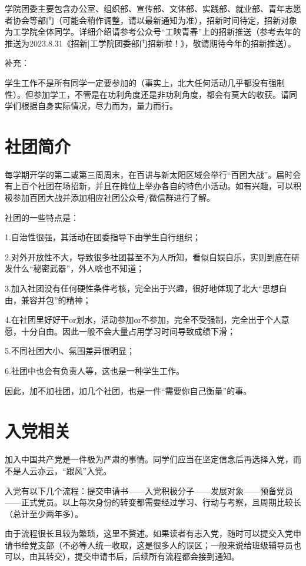 \documentclass[11pt,oneside]{book}
\begin{document}
学院团委主要包含办公室、组织部、宣传部、文体部、实践部、就业部、青年志愿者协会等部门（可能会稍作调整，请以最新通知为准），招新时间待定，招新对象为工学院全体同学。详细介绍请参考公众号“工映青春”上的招新推送（参考去年的推送为2023.8.31《招新|工学院团委部门招新啦！》，敬请期待今年的招新推送）。

补充：

学生工作不是所有同学一定要参加的（事实上，北大任何活动几乎都没有强制性）。但参加学工，不管是在功利角度还是非功利角度，都会有莫大的收获。请同学们根据自身实际情况，尽力而为，量力而行。

\newpage

    \section{社团简介}
    每学期开学的第二或第三周周末，在百讲与新太阳区域会举行“百团大战”。届时会有上百个社团在场招新，并且在摊位上举办各自的特色小活动。如有兴趣，可以积极参加百团大战并添加相应社团公众号/微信群进行了解。

社团的一些特点是：

1.自治性很强，其活动在团委指导下由学生自行组织；

2.对外开放性不大，导致很多社团甚至不为人所知，看似自娱自乐，实则到底在研发什么“秘密武器”，外人啥也不知道；

3.加入社团没有任何硬性条件考核，完全出于兴趣，很好地体现了北大“思想自由，兼容并包”的精神；

4.在社团里好好干or划水，活动参加or不参加，完全不受强制，完全出于个人意愿，十分自由。因此一般不会大量占用学习时间导致成绩下滑；

5.不同社团大小、氛围差异很明显；

6.社团中也会有负责人等，这也是一种学生工作。 

因此，加不加社团，加几个社团，也是一件“需要你自己衡量”的事。

    \section{入党相关}
加入中国共产党是一件极为严肃的事情。同学们应当在坚定信念后再选择入党，而不是人云亦云，“跟风”入党。

入党有以下几个流程：提交申请书——入党积极分子——发展对象——预备党员——正式党员。以上每次身份的转变都需要经过学习、行动与考察，且周期比较长（总计至少两年多）。

由于流程很长且较为繁琐，这里不赘述。如果读者有志入党，随时可以提交入党申请书给党支部（不必等人统一收取，这是很多人的误区；一般来说给班级辅导员也可以，由其转交），提交申请书后，后续所有流程都会接到通知。
\end{document}
